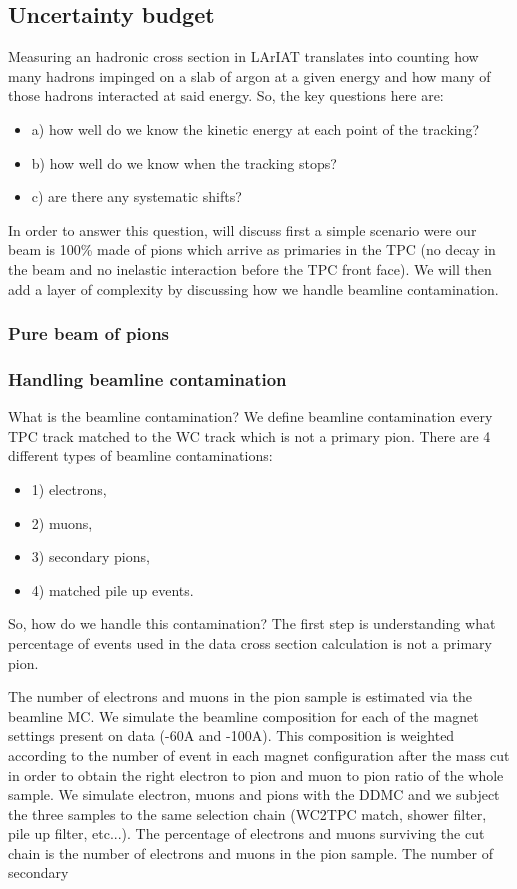 {\subsection{Uncertainty budget}
Measuring an hadronic cross section  in LArIAT translates into counting how many hadrons impinged on a slab of argon at a given energy and how many of those hadrons interacted at said energy. So, the key questions here are:
\begin{itemize}
\item[]a) how well do we know the kinetic energy at each point of the tracking? %
\item[]b) how well do we know when the tracking stops? %
\item[]c) are there any systematic shifts?
\end{itemize}

In order to answer this question, will discuss first a simple scenario  were our beam is 100\% made of pions which arrive as primaries in the TPC (no decay in the beam and no inelastic interaction before the TPC front face). We will then add a layer of complexity by discussing how we handle beamline contamination.
\subsubsection{Pure beam of pions}
\subsubsection{Handling beamline contamination}
What is the beamline contamination? We define beamline contamination every TPC track matched to the WC track which is not a primary pion. There are 4 different types of beamline contaminations:
\begin{itemize}
\item[]1) electrons,
\item[]2) muons,
\item[]3) secondary pions,
\item[]4) matched pile up events.
\end{itemize}
So, how do we handle this contamination?
The first step is understanding what percentage of events used in the data cross section calculation is not a primary pion. 

The number of electrons and muons in the pion sample is estimated via the beamline MC. We simulate the beamline composition for each of the magnet settings present on data (-60A and -100A). This composition is weighted according to the number of event in each magnet configuration after the mass cut in order to obtain the right electron to pion and muon to pion ratio of the whole sample. We simulate electron, muons and pions with the DDMC and we subject the three samples to the same selection chain (WC2TPC match, shower filter, pile up filter, etc...). The percentage of electrons and muons surviving the cut chain is the number of electrons and muons in the pion sample.
The number of secondary 

}
